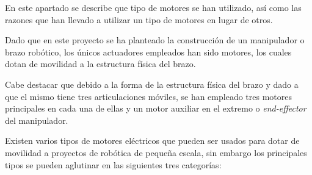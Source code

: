 En este apartado se describe que tipo de motores se han utilizado, así como las razones que han llevado a utilizar un tipo de motores en lugar de otros.

Dado que en este proyecto se ha planteado la construcción de un manipulador o brazo robótico, los únicos actuadores empleados han sido motores, los cuales dotan de movilidad a la estructura física del brazo.

Cabe destacar que debido a la forma de la estructura física del brazo y dado a que el mismo tiene tres articulaciones móviles, se han empleado tres motores principales en cada una de ellas y un motor auxiliar en el extremo o \textit{end-effector} del manipulador.

Existen varios tipos de motores eléctricos que pueden ser usados para dotar de movilidad a proyectos de robótica de pequeña escala, sin embargo los principales tipos se pueden aglutinar en las siguientes tres categorías:

